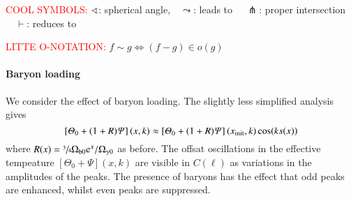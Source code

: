     \textcolor{red}{COOL SYMBOLS:} $\sphericalangle $: spherical angle,$\quad \leadsto $: leads to $\quad\pitchfork$: proper intersection $\quad \vdash$: reduces to


    \textcolor{red}{LITTE O-NOTATION:} $f\sim g \Leftrightarrow (f-g)\in o(g)$
    
    
    




    
    \paragraph{Baryon loading}
    We consider the effect of baryon loading. The slightly less simplified analysis gives
    \begin{equation}
        \left[\varTheta_0 +(1+R) \varPsi\right](x, k) \approx \left[\varTheta_0 + (1+R)\varPsi\right](x_\mathrm{init}, k)\cos(ks(x)) 
    \end{equation}
    where $R(x) = \sfrac{3}{4}\Omega\ped{b0} \eu[x]/\Omega\ped{\gamma 0}$ as before. The offsat oscillations in the effective tempeature $\left[\Theta_0 +\Psi\right](x, k)$ are visible in $C(\ell)$ as variations in the amplitudes of the peaks. The presence of baryons has the effect that odd peaks are enhanced, whilst even peaks are suppressed. 


